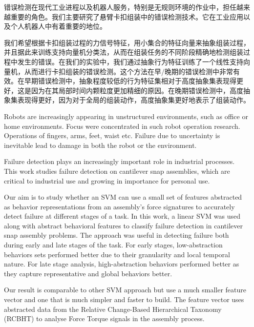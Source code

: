 %

\begin{cabstract}
    错误检测在现代工业进程以及机器人服务，特别是无规则环境的作业中，担任越来越重要的角色。我们主要研究了悬臂卡扣组装中的错误检测技术。它在工业应用以及个人机器人中有着重要的地位。

    \indent 我们希望根据卡扣组装过程的力信号特征，用小集合的特征向量来抽象组装过程，并且据此来训练支持向量机分类法，从而在组装任务的不同阶段精确地检测组装过程中发生的错误。在我们的实验中，我们通过抽象行为特征训练了一个线性支持向量机，从而进行卡扣组装的错误检测。这个方法在早/晚期的错误检测中非常有效。在早期错误检测中，抽象程度较低的行为特征集相对于高度抽象集表现得更好，这是因为在其局部时间内颗粒度更加精细的原因。在晚期错误检测中，高度抽象集表现得更好，因为对于全局的组装动作，高度抽象集更好地表示了组装动作。
    
\end{cabstract}

\begin{eabstract}

    Robots are increasingly appearing in unstructured environments, such as office or home environments. Focus were concentrated in such robot operation research. Operations of fingers, arms, feet, waist etc. Failure due to uncertainty is inevitable lead to damage in both the robot or the environment.

    \indent Failure detection plays an increasingly important role in industrial processes. This work studies failure detection on cantilever snap assemblies, which are critical to industrial use and growing in importance for personal use.

    \indent Our aim is to study whether an SVM can use a small set of features abstracted as behavior representations from an assembly's force signatures to accurately detect failure at different stages of a task. In this work, a linear SVM was used along with abstract behavioral features to classify failure detection in cantilever snap assembly problems. The approach was useful in detecting failure both during early and late stages of the task. For early stages, low-abstraction behaviors sets performed better due to their granularity and local temporal nature. For late stage analysis, high-abstraction behaviors performed better as they capture representative and global behaviors better.

    \indent Our result is comparable to other SVM approach but use a much smaller feature vector and one that is much simpler and faster to build. The feature vector uses abstracted data from the Relative Change-Based Hierarchical Taxonomy (RCBHT) to analyse Force Torque signals in the assembly process. 

\end{eabstract}

